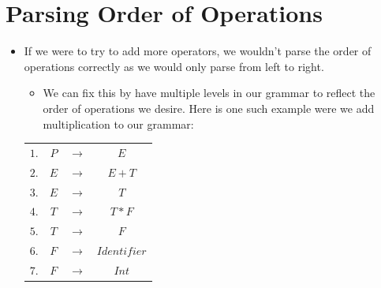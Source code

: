 \documentclass{article}
\begin{document}
\section{Parsing Order of Operations}

\begin{itemize}
    \item If we were to try to add more operators, we wouldn't parse the order of operations correctly as we would only parse from left to right.
    \begin{itemize}
        \item We can fix this by have multiple levels in our grammar to reflect the order of operations we desire. Here is one such example were we add multiplication to our grammar:
    \end{itemize}
    \begin{center}
        \begin{tabular}{ |c c c c| }
            \hline
            $1.$ & $P$ & ${\rightarrow}$ & $E$ \\
            $2.$ & $E$ & ${\rightarrow}$ & $E+T$ \\
            $3.$ & $E$ & ${\rightarrow}$ & $T$ \\
            $4.$ & $T$ & ${\rightarrow}$ & $T*F$ \\
            $5.$ & $T$ & ${\rightarrow}$ & $F$ \\
            $6.$ & $F$ & ${\rightarrow}$ & $Identifier$ \\
            $7.$ & $F$ & ${\rightarrow}$ & $Int$ \\
            \hline
        \end{tabular}
    \end{center}
\end{itemize}
\end{document}
